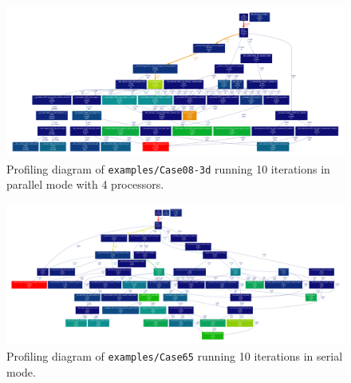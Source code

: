 
\begin{figure}[!h]
  \centering
  \includegraphics[clip,width=\textwidth]{fig-profiling08-3d-mpi.pdf}
  \caption{Profiling diagram of \texttt{examples/Case08-3d} running 10 iterations in parallel mode with 4 processors.}
\end{figure}

\newpage

\begin{figure}[!h]
  \centering
  \includegraphics[clip,width=0.9\textheight,angle=90]{fig-profiling65.pdf}
  \caption{Profiling diagram of \texttt{examples/Case65} running 10 iterations in serial mode.}
\end{figure}

